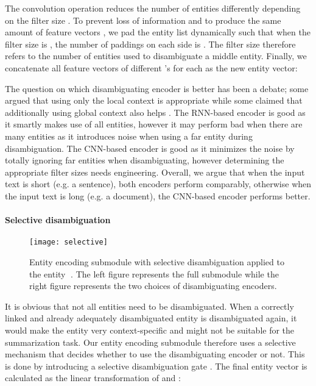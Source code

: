 \documentclass[11pt,a4paper]{article}
\begin{document}
The convolution operation reduces the number of entities differently depending on the filter size . To prevent loss of information and to produce the same amount of feature vectors , we pad the entity list dynamically such that when the filter size is , the number of paddings on each side is . The filter size  therefore refers to the number of entities used to disambiguate a middle entity. Finally, we concatenate all feature vectors of different 's for each  as the new entity vector:


The question on which disambiguating encoder is better has been a debate; some argued that using only the local context is appropriate \cite{lau2013unimelb} while some claimed that additionally using global context also helps \cite{wang2015sense}.
The RNN-based encoder is good as it smartly makes use of all entities, however it may perform bad when there are many entities as it introduces noise when using a far entity during disambiguation. The CNN-based encoder is good as it minimizes the noise by totally ignoring far entities when disambiguating, however determining the appropriate filter sizes  needs engineering. Overall, we argue that when the input text is short (e.g. a sentence), both encoders perform comparably, otherwise when the input text is long (e.g. a document), the CNN-based encoder performs better.

\paragraph{Selective disambiguation}

\begin{figure}[t]
    \centering
    \texttt{[image: selective]}
    \caption{Entity encoding submodule with selective disambiguation applied to the entity \textcircled{\raisebox{-0.9pt}{3}}. 
    The left figure represents the full submodule while the right figure represents the two choices of disambiguating encoders.
}
    \label{fig:sd}
\end{figure}

It is obvious that not all entities need to be disambiguated. When a correctly linked and already adequately disambiguated entity is disambiguated again, it would make the entity very context-specific and might not be suitable for the summarization task. Our entity encoding submodule therefore uses a selective mechanism that decides whether to use the disambiguating encoder or not. This is done by introducing a selective disambiguation gate . The final entity vector  is calculated as the linear transformation of  and :
\end{document}
